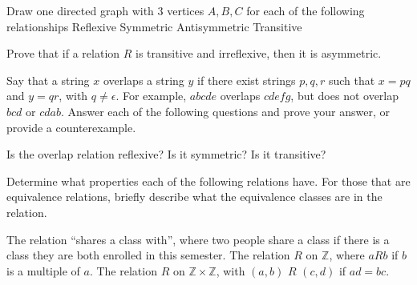 \documentclass[solution, letterpaper]{cs20inclass}
\begin{document}
\problem
Draw one directed graph with 3 vertices $A, B, C$ for each of the following relationships
\subproblem Reflexive
\subproblem Symmetric
\subproblem Antisymmetric
\subproblem Transitive


\begin{solution}
\end{solution}

\problem
Prove that if a relation $R$ is transitive and irreflexive, then it is asymmetric.

\begin{solution}
\end{solution}

\problem Say that a string $x$ overlaps a string $y$ if there exist strings $p,q,r$ such that $x = pq$ and $y = qr$, with $q \neq \epsilon$. For example, $abcde$ overlaps $cdefg$, but does not overlap $bcd$ or $cdab$. Answer each of the following questions and prove your answer, or provide a counterexample.

\subproblem Is the overlap relation reflexive? 
\subproblem Is it symmetric?
\subproblem Is it transitive?

\begin{solution}
\end{solution}

\problem Determine what properties each of the following relations have. For those that are equivalence relations, briefly describe what the equivalence classes are in the relation.

\subproblem The relation ``shares a class with'', where two people share a class if there is a class they are both enrolled in this semester.
\subproblem The relation $R$ on $\mathbb{Z}$, where $aRb$ if $b$ is a multiple of $a$.
\subproblem The relation $R$ on $\mathbb{Z} \times \mathbb{Z}$, with $(a,b)$ $R$ $(c,d)$ if $ad = bc$. 


\begin{solution}
\end{solution}
\end{document}
